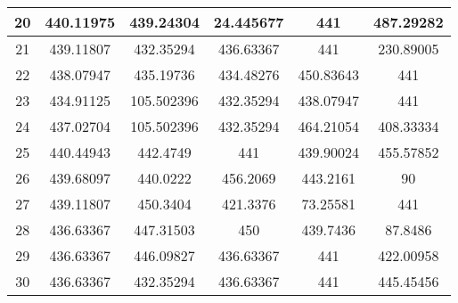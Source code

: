 \begin{table}
\begin{center}
\begin{tabular}{|c|c|c|c|c|c|}
20 & 440.11975 & 439.24304  & 24.445677 & 441       & 487.29282  \\ \hline
21 & 439.11807 & 432.35294  & 436.63367 & 441       & 230.89005  \\ \hline
22 & 438.07947 & 435.19736  & 434.48276 & 450.83643 & 441        \\ \hline
23 & 434.91125 & 105.502396 & 432.35294 & 438.07947 & 441        \\ \hline
24 & 437.02704 & 105.502396 & 432.35294 & 464.21054 & 408.33334  \\ \hline
25 & 440.44943 & 442.4749   & 441       & 439.90024 & 455.57852  \\ \hline
26 & 439.68097 & 440.0222   & 456.2069  & 443.2161  & 90         \\ \hline
27 & 439.11807 & 450.3404   & 421.3376  & 73.25581  & 441        \\ \hline
28 & 436.63367 & 447.31503  & 450       & 439.7436  & 87.8486    \\ \hline
29 & 436.63367 & 446.09827  & 436.63367 & 441       & 422.00958  \\ \hline
30 & 436.63367 & 432.35294  & 436.63367 & 441       & 445.45456  \\ \hline
\end{tabular}
\label{table:przyklad}
\end{center}
\end{table}



